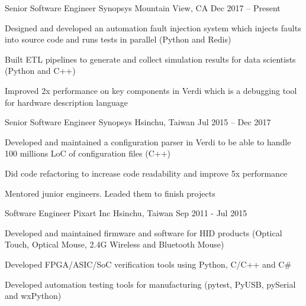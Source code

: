 

\begin{cventries}

  \cventry
    {Senior Software Engineer} %
    {Synopsys} %
    {Mountain View, CA} %
    {Dec 2017 – Present} %
    {
      \begin{cvitems} %
        \item {Designed and developed an automation fault injection system which injects faults into source code and runs tests in parallel (Python and Redis)}
        \item {Built ETL pipelines to generate and collect simulation results for data scientists (Python and C++)}
        \item {Improved 2x performance on key components in Verdi which is a debugging tool for hardware description language}
      \end{cvitems}
    }

  \cventry
    {Senior Software Engineer} %
    {Synopsys} %
    {Hsinchu, Taiwan} %
    {Jul 2015 – Dec 2017} %
    {
      \begin{cvitems} %
        \item {Developed and maintained a configuration parser in Verdi to be able to handle 100 millions LoC of configuration files (C++)}
        \item {Did code refactoring to increase code readability and improve 5x performance}
        \item {Mentored junior engineers. Leaded them to finish projects}
      \end{cvitems}
    }
  \cventry
    {Software Engineer} %
    {Pixart Inc} %
    {Hsinchu, Taiwan} %
    {Sep 2011 - Jul 2015} %
    {
      \begin{cvitems} %
        \item {Developed and maintained firmware and software for HID products (Optical Touch, Optical Mouse, 2.4G Wireless and Bluetooth Mouse)}
        \item {Developed FPGA/ASIC/SoC verification tools using Python, C/C++ and {C\#}}
        \item {Developed automation testing tools for manufacturing (pytest, PyUSB, pySerial and wxPython)}
      \end{cvitems}
    }
\end{cventries}
